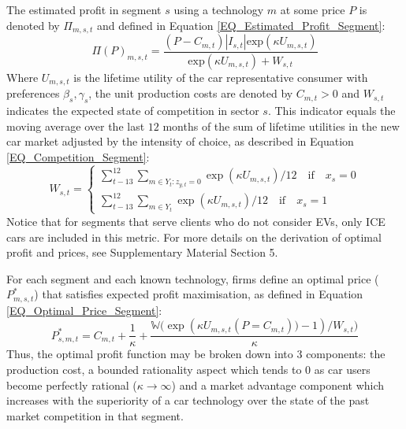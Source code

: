 \documentclass[12pt]{article}
\begin{document}
	The estimated profit in segment $s$ using a technology $m$ at some price $P$ is denoted by $\Pi_{m,s,t}$ and defined in Equation \ref{EQ_Estimated_Profit_Segment}:
	\begin{equation}
		\Pi(P)_{m,s,t} = \frac{(P-C_{m,t})|I_{s,t}|\text{exp}(\kappa U_{m,s,t})}{\text{exp}(\kappa U_{m,s,t})+W_{s,t}}
		\label{EQ_Estimated_Profit_Segment}
	\end{equation}
	Where $U_{m,s,t}$ is the lifetime utility of the car representative consumer with preferences $\beta_s,\gamma_s$, the unit production costs are denoted by $C_{m,t}>0$ and $W_{s,t}$ indicates the expected state of competition in sector $s$. This indicator equals the moving average over the last $12$ months of the sum of lifetime utilities in the new car market adjusted by the intensity of choice, as described in Equation \ref{EQ_Competition_Segment}:
	\begin{equation}
		W_{s,t} = \begin{cases}
			\sum_{t-13}^{12} \sum_{m \in Y_t : z_{y,t}=0} \exp(\kappa U_{m,s,t})/12\quad\text{if}\quad x_s =0 \\
			\sum_{t-13}^{12} \sum_{m \in Y_t} \exp(\kappa U_{m,s,t})/12\quad\text{if}\quad x_s =1
		\end{cases}
		\label{EQ_Competition_Segment}
	\end{equation}
	Notice that for segments that serve clients who do not consider EVs, only ICE cars are included in this metric. For more details on the derivation of optimal profit and prices, see Supplementary Material Section 5.
	
	For each segment and each known technology, firms define an optimal price ($P^*_{m,s,t}$) that satisfies expected profit maximisation, as defined in Equation \ref{EQ_Optimal_Price_Segment}:
	\begin{equation}
		P^*_{s,m,t} = C_{m,t} + \frac{1}{\kappa } +  \frac{ \mathbb{W}\bigg(\exp \left(\kappa U_{m,s,t}(P=C_{m,t}) )-1\right)/{W_{s,t}}\bigg)}{\kappa } 
		\label{EQ_Optimal_Price_Segment}
	\end{equation}
	Thus, the optimal profit function may be broken down into 3 components: the production cost, a bounded rationality aspect which tends to 0 as car users become perfectly rational ($\kappa\xrightarrow{}\infty$) and a market advantage component which increases with the superiority of a car technology over the state of the past market competition in that segment.
	
\end{document}
